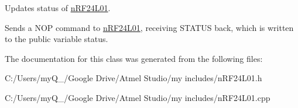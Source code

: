Updates status of \hyperlink{classn_r_f24_l01}{n\-R\-F24\-L01}. 

Sends a N\-O\-P command to \hyperlink{classn_r_f24_l01}{n\-R\-F24\-L01}, receiving S\-T\-A\-T\-U\-S back, which is written to the public variable status. 

The documentation for this class was generated from the following files\-:\begin{DoxyCompactItemize}
\item 
C\-:/\-Users/my\-Q\-\_/\-Google Drive/\-Atmel Studio/my includes/n\-R\-F24\-L01.\-h\item 
C\-:/\-Users/my\-Q\-\_/\-Google Drive/\-Atmel Studio/my includes/n\-R\-F24\-L01.\-cpp\end{DoxyCompactItemize}
